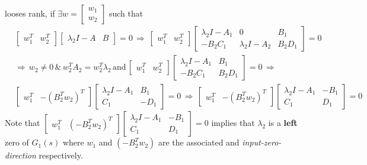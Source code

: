 \documentclass[twoside]{article}
\begin{document}
looses rank, if $\exists w = \begin{bmatrix} w_1 \\ w_2 \end{bmatrix}$ such that 
%
\begin{align*}
	&\begin{bmatrix} w_1^T & w_2^T \end{bmatrix} \left[ \begin{array}{c|c} \lambda_2 I - A & B \end{array} \right]
	= 0 \, \Rightarrow \, 
	\begin{bmatrix} w_1^T & w_2^T \end{bmatrix} \left[ \begin{array}{c|c|c} \lambda_2 I - A_1 & 0 & B_1 \\ \hline -B_2 C_1 & \lambda_2 I - A_2 & B_2 D_1 
	\end{array} \right] = 0
	\\
	&\Rightarrow \, w_2 \neq 0 \, \& \, w_2^T A_2 = w_2^T \lambda_2 
	\, \mathrm{and} \, \begin{bmatrix} w_1^T & w_2^T \end{bmatrix} \left[ \begin{array}{c|c} \lambda_2 I - A_1 & B_1 \\ \hline -B_2 C_1 & B_2 D_1 
	\end{array} \right] = 0 \, \Rightarrow \,
	\\
	&\begin{bmatrix} w_1^T & -(B_2^T w_2)^T \end{bmatrix} \left[ \begin{array}{c|c} \lambda_2 I - A_1 & B_1 \\ \hline C_1 & -D_1 
	\end{array} \right] = 0 \, \Rightarrow \,
	\begin{bmatrix} w_1^T & -(B_2^T w_2)^T \end{bmatrix} \left[ \begin{array}{c|c} \lambda_2 I - A_1 & -B_1 \\ \hline C_1 & D_1 
	\end{array} \right] = 0
\end{align*}
%
Note that $\begin{bmatrix} w_1^T & (-B_2^T w_2)^T \end{bmatrix} \left[ \begin{array}{c|c} \lambda_2 I - A_1 & -B_1 \\ \hline C_1 & D_1 
	\end{array} \right] = 0$
implies that $\lambda_2$ is a \textbf{left} zero of $G_1(s)$ where $w_1$ and $(-B_2^T w_2)$ 
are the associated  and \textit{input-zero-direction} respectively. 
\end{document}
